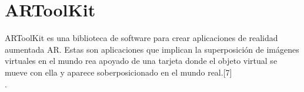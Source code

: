 \section{ARToolKit}
ARToolKit es una biblioteca de software para crear aplicaciones de realidad aumentada AR. Estas son aplicaciones que implican la superposición de imágenes virtuales en el mundo rea apoyado de una tarjeta donde el objeto virtual se mueve con ella y aparece soberposicionado en el mundo real.[7]\\.\par 

